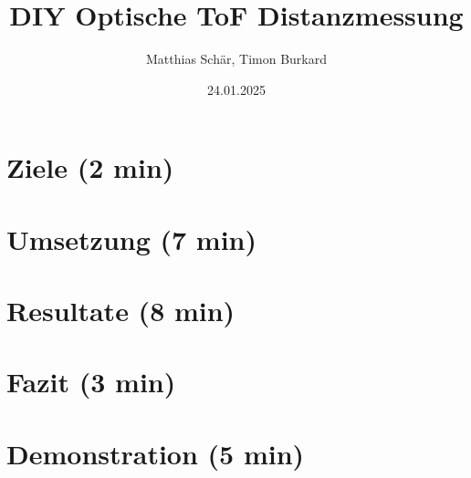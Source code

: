\documentclass[aspectratio=169]{beamer}
\title{DIY Optische ToF Distanzmessung}
\author{Matthias Schär, Timon Burkard}
\institute{OST -- Ostschweizer Fachhochschule}
\date{24.01.2025}
\begin{document}




\section[Ziele]{Ziele (2 min)}


\section[Umsetzung]{Umsetzung (7 min)}


\section[Resultate]{Resultate (8 min)}


\section[Fazit]{Fazit (3 min)}


\section[Demonstration]{Demonstration (5 min)}



\miniframesoff

\questions{}

%
\end{document}
